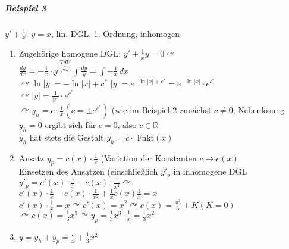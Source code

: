 \documentclass[a4paper]{scrartcl}
\begin{document}
\subparagraph{Beispiel 3} $y' + \frac{1}{x} \cdot y = x$, lin. DGL, 1. Ordnung, inhomogen
\begin{enumerate}
\item Zugehörige homogene DGL: $y' + \frac{1}{x} y = 0 \curvearrowright$\\
$\frac{dy}{dx} = - \frac{1}{x} \cdot y \overbrace{\curvearrowright}^{TdV} \int \frac{dy}{y} = \int -\frac{1}{x} \, dx $\\
$\curvearrowright \ln{\lvert y \rvert} = - \ln{\lvert x \rvert} + c^*$
$\lvert y \rvert = e^{-\ln{\lvert x \rvert} + c^*} = e^{-\ln{\lvert x \rvert}} \cdot e^{c^*}$\\
$\curvearrowright \lvert y \rvert = \frac{1}{\lvert x \rvert} \cdot e^{c^*}$\\
$\curvearrowright y_h = c \cdot \frac{1}{x} (c= \pm e^{c^*})$ (wie im Beispiel 2 zunächst $c \neq 0$, Nebenlösung $y_h = 0$ ergibt sich für $c=0$, also $c \in \mathbb{R}$\\
$y_h$ hat stets die Gestalt $y_h = c \cdot$ Fnkt$(x)$
\item Ansatz $y_p = c(x) \cdot \frac{1}{x}$ (Variation der Konstanten $c \rightarrow c(x)$\\
Einsetzen des Ansatzen (einschließlich $y'_p$ in inhomogene DGL\\
$y'_p = c'(x) \cdot \frac{1}{x} - c(x) \cdot \frac{1}{x^2} \curvearrowright$\\
$c'(x) \cdot \frac{1}{x} -c(x) \cdot \frac{1}{x^2} + \frac{1}{x} c(x) \frac{1}{x} = x$\\
$c'(x) \cdot \frac{1}{x} = x \curvearrowright c'(x) = x^2  \curvearrowright c(x) = \frac{x^3}{3} + K (K=0)$\\
$\curvearrowright c(x) = \frac{1}{3} x^3 \curvearrowright y_p = \frac{1}{3} x^3 \cdot \frac{1}{x} = \frac{1}{3} x^2$
\item $y= y_h + y_p = \frac{c}{x} + \frac{1}{3} x^2$
\end{enumerate}
\end{document}

